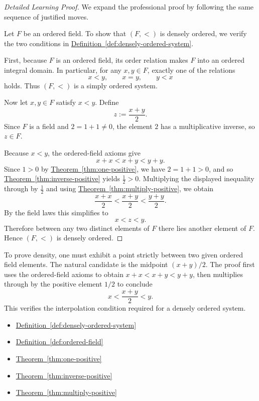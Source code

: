 \begin{proof}[Detailed Learning Proof]
\LRAProofBodyStart
We expand the professional proof by following the same sequence of justified moves.

Let $F$ be an ordered field. To show that $(F,<)$ is densely ordered, we verify
the two conditions in
\hyperref[def:densely-ordered-system]{Definition~\ref*{def:densely-ordered-system}}.

First, because $F$ is an ordered field, its order relation makes $F$ into an
ordered integral domain. In particular, for any $x,y\in F$, exactly one of the
relations
\[
x<y,\qquad x=y,\qquad y<x
\]
holds. Thus $(F,<)$ is a simply ordered system.

Now let $x,y\in F$ satisfy $x<y$. Define
\[
z:=\frac{x+y}{2}.
\]
Since $F$ is a field and $2=1+1\neq 0$, the element $2$ has a multiplicative
inverse, so $z\in F$.

Because $x<y$, the ordered-field axioms give
\[
x+x<x+y<y+y.
\]
Since $1>0$ by
\hyperref[thm:one-positive]{Theorem~\ref*{thm:one-positive}}, we have
$2=1+1>0$, and so
\hyperref[thm:inverse-positive]{Theorem~\ref*{thm:inverse-positive}} yields
$\frac12>0$. Multiplying the displayed inequality through by $\frac12$ and using
\hyperref[thm:multiply-positive]{Theorem~\ref*{thm:multiply-positive}}, we obtain
\[
\frac{x+x}{2}<\frac{x+y}{2}<\frac{y+y}{2}.
\]
By the field laws this simplifies to
\[
x<z<y.
\]
Therefore between any two distinct elements of $F$ there lies another element
of $F$. Hence $(F,<)$ is densely ordered.
\end{proof}

\begin{remark*}
To prove density, one must exhibit a point strictly between two given ordered
field elements. The natural candidate is the midpoint $(x+y)/2$. The proof
first uses the ordered-field axioms to obtain $x+x<x+y<y+y$, then multiplies
through by the positive element $1/2$ to conclude
\[
x<\frac{x+y}{2}<y.
\]
This verifies the interpolation condition required for a densely ordered
system.
\end{remark*}

\begin{dependencies}
\begin{itemize}
  \item \hyperref[def:densely-ordered-system]{Definition~\ref*{def:densely-ordered-system}}
  \item \hyperref[def:ordered-field]{Definition~\ref*{def:ordered-field}}
  \item \hyperref[thm:one-positive]{Theorem~\ref*{thm:one-positive}}
  \item \hyperref[thm:inverse-positive]{Theorem~\ref*{thm:inverse-positive}}
  \item \hyperref[thm:multiply-positive]{Theorem~\ref*{thm:multiply-positive}}
\end{itemize}
\end{dependencies}

\clearpage
